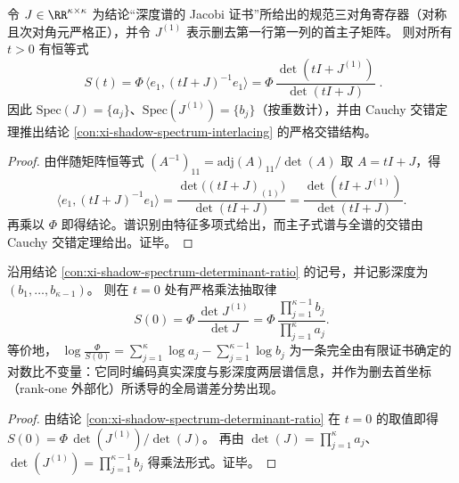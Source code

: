 \begin{proposition}\label{con:xi-shadow-spectrum-determinant-ratio}
令 \(J\in\RR^{\kappa\times\kappa}\) 为结论“深度谱的 Jacobi 证书”所给出的规范三对角寄存器（对称且次对角元严格正），并令 \(J^{(1)}\) 表示删去第一行第一列的首主子矩阵。
则对所有 \(t>0\) 有恒等式
\[
\boxed{\;
S(t)=\Phi\,\langle e_1,(tI+J)^{-1}e_1\rangle
=\Phi\,\frac{\det(tI+J^{(1)})}{\det(tI+J)}\; }.
\]
因此 \(\mathrm{Spec}(J)=\{a_j\}\)、\(\mathrm{Spec}(J^{(1)})=\{b_j\}\)（按重数计），并由 Cauchy 交错定理推出结论 \ref{con:xi-shadow-spectrum-interlacing} 的严格交错结构。
\end{proposition}
\begin{proof}
由伴随矩阵恒等式 \((A^{-1})_{11}=\mathrm{adj}(A)_{11}/\det(A)\) 取 \(A=tI+J\)，得
\[
\langle e_1,(tI+J)^{-1}e_1\rangle
=\frac{\det\bigl((tI+J)_{(1)}\bigr)}{\det(tI+J)}
=\frac{\det(tI+J^{(1)})}{\det(tI+J)}.
\]
再乘以 \(\Phi\) 即得结论。谱识别由特征多项式给出，而主子式谱与全谱的交错由 Cauchy 交错定理给出。证毕。
\end{proof}

\begin{corollary}[影谱--行列式比的乘法抽取：在 \texorpdfstring{$t=0$}{t=0} 处给出深度与影深度的对数比不变量]\label{cor:xi-shadow-spectrum-determinant-ratio-at-zero}
沿用结论 \ref{con:xi-shadow-spectrum-determinant-ratio} 的记号，并记影深度为 \((b_1,\dots,b_{\kappa-1})\)。
则在 \(t=0\) 处有严格乘法抽取律
\[
\boxed{\;
S(0)=\Phi\,\frac{\det J^{(1)}}{\det J}
=\Phi\,\frac{\prod_{j=1}^{\kappa-1}b_j}{\prod_{j=1}^{\kappa}a_j}.\;}
\]
等价地，
\(
\log\frac{\Phi}{S(0)}=\sum_{j=1}^{\kappa}\log a_j-\sum_{j=1}^{\kappa-1}\log b_j
\)
为一条完全由有限证书确定的对数比不变量：它同时编码真实深度与影深度两层谱信息，并作为删去首坐标（rank-one 外部化）所诱导的全局谱差分势出现。
\end{corollary}
\begin{proof}
由结论 \ref{con:xi-shadow-spectrum-determinant-ratio} 在 \(t=0\) 的取值即得
\(
S(0)=\Phi\,\det(J^{(1)})/\det(J)
\)。
再由 \(\det(J)=\prod_{j=1}^{\kappa}a_j\)、\(\det(J^{(1)})=\prod_{j=1}^{\kappa-1}b_j\) 得乘法形式。证毕。
\end{proof}

